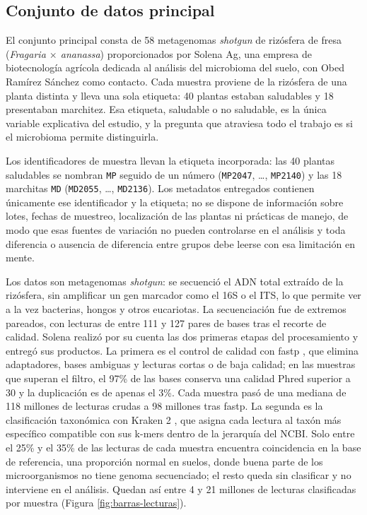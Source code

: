 \subsection{Conjunto de datos principal}
\label{sec:met-datos}

El conjunto principal consta de 58 metagenomas \emph{shotgun} de rizósfera de fresa
(\textit{Fragaria $\times$ ananassa}) proporcionados por Solena Ag, una empresa de biotecnología
agrícola dedicada al análisis del microbioma del suelo, con Obed Ramírez Sánchez como contacto. Cada
muestra proviene de la rizósfera de una planta distinta y lleva una sola etiqueta: 40 plantas
estaban saludables y 18 presentaban marchitez. Esa etiqueta, saludable o no saludable, es la única
variable explicativa del estudio, y la pregunta que atraviesa todo el trabajo es si el microbioma
permite distinguirla.

Los identificadores de muestra llevan la etiqueta incorporada: las 40 plantas saludables se
nombran \texttt{MP} seguido de un número (\texttt{MP2047}, \ldots, \texttt{MP2140}) y las 18
marchitas \texttt{MD} (\texttt{MD2055}, \ldots, \texttt{MD2136}). Los metadatos entregados
contienen únicamente ese identificador y la etiqueta; no se dispone de información sobre lotes,
fechas de muestreo, localización de las plantas ni prácticas de manejo, de modo que esas fuentes de
variación no pueden controlarse en el análisis y toda diferencia o ausencia de diferencia entre
grupos debe leerse con esa limitación en mente.

Los datos son metagenomas \emph{shotgun}: se secuenció el ADN total extraído de la rizósfera, sin
amplificar un gen marcador como el 16S o el ITS, lo que permite ver a la vez bacterias, hongos y
otros eucariotas. La secuenciación fue de extremos pareados, con lecturas de entre 111 y 127 pares
de bases tras el recorte de calidad. Solena realizó por su cuenta las dos primeras etapas del
procesamiento y entregó sus productos. La primera es el control de calidad con fastp
\citep{chen2018fastp}, que elimina adaptadores, bases ambiguas y lecturas cortas o de baja
calidad; en las muestras que superan el filtro, el 97\% de las bases conserva una calidad Phred
superior a 30 y la duplicación es de apenas el 3\%. Cada muestra pasó de una mediana de 118 millones
de lecturas crudas a 98 millones tras fastp. La segunda es la clasificación taxonómica con Kraken 2
\citep{wood2014kraken}, que asigna cada lectura al taxón más específico compatible con sus k-mers
dentro de la jerarquía del NCBI. Solo entre el 25\% y el 35\% de las lecturas de cada muestra
encuentra coincidencia en la base de referencia, una proporción normal en suelos, donde buena parte
de los microorganismos no tiene genoma secuenciado; el resto queda sin clasificar y no interviene en
el análisis. Quedan así entre 4 y 21 millones de lecturas clasificadas por muestra
(Figura \ref{fig:barras-lecturas}).

